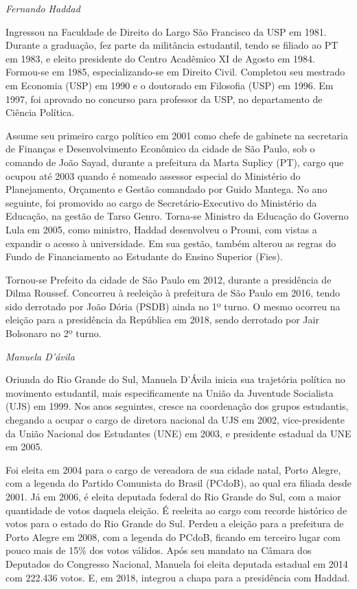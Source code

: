 \emph{Fernando Haddad}

Ingressou na Faculdade de Direito do Largo São Francisco da USP em 1981.
Durante a graduação, fez parte da militância estudantil, tendo se
filiado ao PT em 1983, e eleito presidente do Centro Acadêmico XI de
Agosto em 1984. Formou-se em 1985, especializando-se em Direito Civil.
Completou seu mestrado em Economia (USP) em 1990 e o doutorado em
Filosofia (USP) em 1996. Em 1997, foi aprovado no concurso para
professor da USP, no departamento de Ciência Política.

Assume seu primeiro cargo político em 2001 como chefe de gabinete na
secretaria de Finanças e Desenvolvimento Econômico da cidade de São
Paulo, sob o comando de João Sayad, durante a prefeitura da Marta
Suplicy (PT), cargo que ocupou até 2003 quando é nomeado assessor
especial do Ministério do Planejamento, Orçamento e Gestão comandado por
Guido Mantega. No ano seguinte, foi promovido ao cargo de
Secretário-Executivo do Ministério da Educação, na gestão de Tarso
Genro. Torna-se Ministro da Educação do Governo Lula em 2005, como
ministro, Haddad desenvolveu o Prouni, com vistas a expandir o acesso à
universidade. Em sua gestão, também alterou as regras do Fundo de
Financiamento ao Estudante do Ensino Superior (Fies).

Tornou-se Prefeito da cidade de São Paulo em 2012, durante a presidência
de Dilma Roussef. Concorreu à reeleição à prefeitura de São Paulo em
2016, tendo sido derrotado por João Dória (PSDB) ainda no 1º turno. O
mesmo ocorreu na eleição para a presidência da República em 2018, sendo
derrotado por Jair Bolsonaro no 2º turno.

\emph{Manuela D'ávila}

Oriunda do Rio Grande do Sul, Manuela D'Ávila inicia sua trajetória
política no movimento estudantil, mais especificamente na União da
Juventude Socialista (UJS) em 1999. Nos anos seguintes, cresce na
coordenação dos grupos estudantis, chegando a ocupar o cargo de diretora
nacional da UJS em 2002, vice-presidente da União Nacional dos
Estudantes (UNE) em 2003, e presidente estadual da UNE em 2005.

Foi eleita em 2004 para o cargo de vereadora de sua cidade natal, Porto
Alegre, com a legenda do Partido Comunista do Brasil (PCdoB), ao qual
era filiada desde 2001. Já em 2006, é eleita deputada federal do Rio
Grande do Sul, com a maior quantidade de votos daquela eleição. É
reeleita ao cargo com recorde histórico de votos para o estado do Rio
Grande do Sul. Perdeu a eleição para a prefeitura de Porto Alegre em
2008, com a legenda do PCdoB, ficando em terceiro lugar com pouco mais
de 15\% dos votos válidos. Após seu mandato na Câmara dos Deputados do
Congresso Nacional, Manuela foi eleita deputada estadual em 2014 com
222.436 votos. E, em 2018, integrou a chapa para a presidência com
Haddad.

